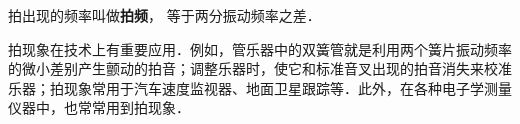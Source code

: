 拍出现的频率叫做\textbf{拍频}， 等于两分振动频率之差．

拍现象在技术上有重要应用．例如，管乐器中的双簧管就是利用两个簧片振动频率的微小差别产生颤动的拍音；调整乐器时，使它和标准音叉出现的拍音消失来校准乐器；拍现象常用于汽车速度监视器、地面卫星跟踪等．此外，在各种电子学测量仪器中，也常常用到拍现象．